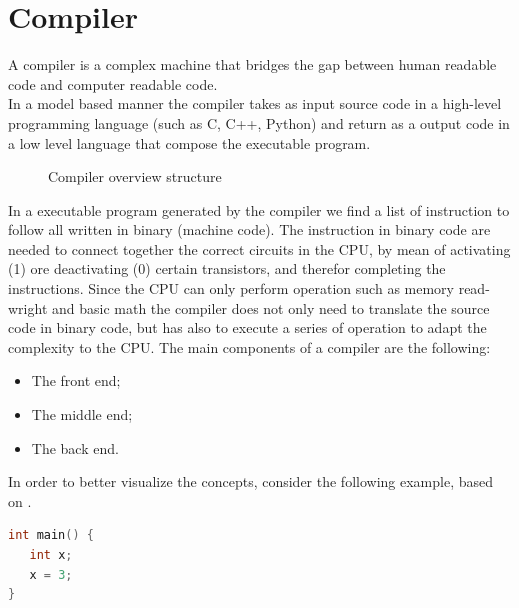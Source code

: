 \documentclass[../main.tex]{subfiles}
\begin{document}
\section{Compiler}
A compiler is a complex machine that bridges the gap between human readable code and computer readable code.\\
In a model based manner the compiler takes as input source code in a high-level programming language (such as C, C++, Python) and return as a output code in a low level language that compose the executable program. 
\begin{figure}[h]
  \centering
{}
  \caption{Compiler overview structure}
\end{figure}
In a executable program generated by the compiler we find a list of instruction to follow all written in binary (machine code). The instruction in binary code are needed to connect together the correct circuits in the CPU, by mean of activating (1) ore deactivating (0) certain transistors, and therefor completing the instructions. Since the CPU can only perform operation such as memory read-wright and basic math the compiler does not only need to translate the source code in binary code, but has also to execute a series of operation to adapt the complexity to the CPU. 
The main components of a compiler are the following:
\begin{itemize}
    \item The front end;
    \item The middle end;
    \item The back end. 
\end{itemize}
In order to better visualize the concepts, consider the following example, based on \cite{frametheessence}. 
  \begin{lstlisting}[language=C]
int main() {
   int x;
   x = 3;
}
  \end{lstlisting}
\end{document}
